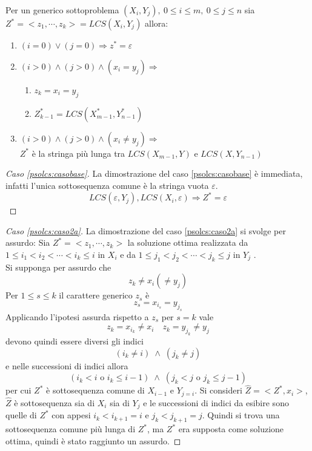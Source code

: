 \begin{lemma}
    Per un generico sottoproblema $\left( X_i, Y_j \right), \: 0 \leq i \leq m, \: 0 \leq j \leq n$ sia 
    $ Z^* = < z_1, \cdots, z_k > = LCS\left( X_i,Y_j \right)$ allora:
    \begin{enumerate}
        \item $(i=0) \vee (j=0) \Rightarrow z^* = \varepsilon$
            \label{psolcs:casobase}
        \item $(i>0) \wedge (j>0) \wedge (x_i = y_j) \Rightarrow $
            \begin{enumerate}
                \item $z_k = x_i = y_j$
                    \label{psolcs:caso2a}
                \item $Z_{k-1}^* = LCS(X_{m-1}^*, Y_{n-1}^*)$
                    \label{psolcs:caso2b}
            \end{enumerate}
        \item $(i>0) \wedge (j>0) \wedge (x_i \neq y_j) \Rightarrow $
            \\
            $ Z^*$ è la stringa più lunga tra $LCS\left( X_{m-1}, Y \right)$ e $LCS\left( X, Y_{n-1} \right)$
    \end{enumerate}
    \label{lemma:psolcs}
\end{lemma}

\begin{proof}[Caso \ref{psolcs:casobase}]
    La dimostrazione del caso \ref{psolcs:casobase} è immediata, infatti l'unica sottosequenza comune è la stringa vuota $\varepsilon$.
    \[
        LCS(\varepsilon, Y_j), LCS(X_i, \varepsilon) \Rightarrow Z^*=\varepsilon 
    \]
\end{proof}

\begin{proof}[Caso \ref{psolcs:caso2a}]
    La dimostrazione del caso \ref{psolcs:caso2a} si svolge per assurdo:
    Sia 
    $ Z^* = < z_1, \cdots, z_k > $
    la soluzione ottima realizzata da 
    $1 \leq i_1 < i_2 < \cdots < i_k \leq i $ in $X_i$
    e da
    $1 \leq j_1 < j_2 < \cdots < j_k \leq j $ in $Y_j$
    .\\
    Si supponga per assurdo che
    \[
        z_k \neq x_i ( \neq y_j)
    \]
    Per $1 \leq s \leq k$ il carattere generico $z_s$ è
    \[
        z_s = x_{i_s} = y_{j_s}
    \]
    Applicando l'ipotesi assurda rispetto a  $z_s$ per $s=k$ vale
    \[
        z_k = x_{i_k} \neq x_i \quad z_k = y_{j_k} \neq y_j
    \]
    devono quindi essere diversi gli indici
    \[
        (i_k \neq i) \; \wedge \; (j_k \neq j)
    \]
    e nelle successioni di indici allora
    \[
        (i_k<i \text{ o } i_k \leq i-1) 
        \; \wedge \;
        (j_k<j \text{ o } j_k \leq j-1)
    \]
    per cui $Z^*$ è sottosequenza comune di $X_{i-1}$ e $Y_{j=i}$.
    Si consideri $\hat{Z} = < Z^* , x_i >$, $\hat{Z}$ è sottosequenza sia di $X_i$ sia di $Y_j$
    e le successioni di indici da esibire sono quelle di $Z^*$ con appesi $i_k < i_{k+1} = i$ e $j_k < j_{k+1} = j$.
    Quindi si trova una sottosequenza comune più lunga di $Z^*$, ma $Z^*$ era supposta come soluzione ottima, quindi è stato raggiunto un assurdo.
\end{proof}

